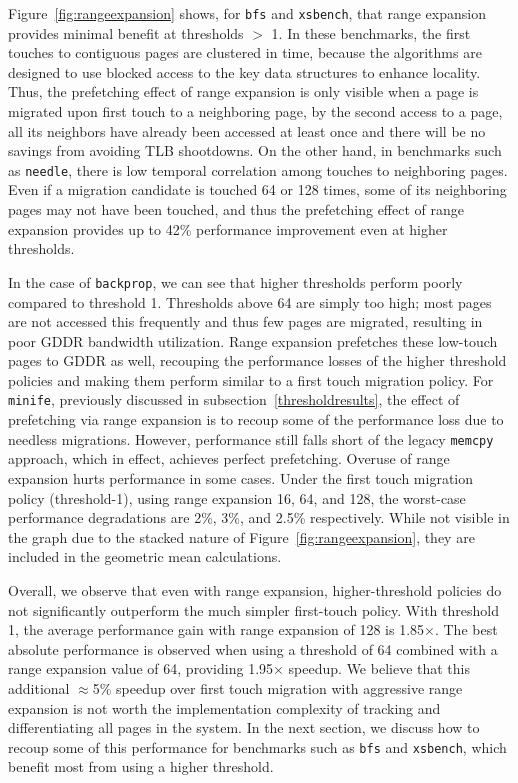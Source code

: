 Figure~\ref{fig:rangeexpansion} shows, for {\tt bfs} and {\tt xsbench}, that range expansion provides minimal
benefit at thresholds $>$ 1. In these benchmarks, the first touches to
contiguous pages are clustered in time, because the algorithms are designed to use blocked access to the key 
data structures to enhance locality. Thus, the prefetching effect of range
expansion is only visible when a page is migrated upon first touch to a
neighboring page, by the second access to a page, all its neighbors have already been accessed 
at least once and there will be no savings from avoiding TLB shootdowns. On the other hand, in benchmarks 
such as {\tt needle}, there is low temporal correlation among touches to neighboring pages.
Even if a migration candidate is touched 64 or 128 times, some of its
neighboring pages may not have been touched, and thus the prefetching
effect of range expansion provides up to 42\% performance improvement even at higher thresholds.

In the case of {\tt backprop}, we can see that higher thresholds perform poorly
compared to threshold 1. Thresholds above 64 are simply too high; most pages are not accessed
this frequently and thus few pages are migrated, resulting in poor GDDR bandwidth utilization.
Range expansion prefetches these low-touch pages to GDDR as well, recouping the performance losses 
of the higher threshold policies and making them perform similar to a first touch migration policy.
For {\tt minife}, previously discussed in subsection~\ref{thresholdresults}, the effect of prefetching
via range expansion is to recoup some of the performance loss due to needless migrations. However,
performance still falls short of the legacy {\tt memcpy} approach, which in effect, achieves perfect prefetching.
Overuse of range expansion hurts performance in some cases. Under the 
first touch migration policy (threshold-1), using range expansion 16, 64, and 128, the worst-case
performance degradations are 2\%, 3\%, and 2.5\% respectively. While not visible in the graph due to the stacked
nature of Figure~\ref{fig:rangeexpansion}, they are included in the geometric mean calculations.

Overall, we observe that even with range expansion, higher-threshold policies
do not significantly outperform the much simpler first-touch policy. 
With threshold 1, the average performance gain with range expansion of 128 is
1.85$\times$.  The best absolute performance is observed when using a threshold of
64 combined with a range expansion value of 64, providing 1.95$\times$ speedup.
We believe that this additional $\approx$5\% speedup over first touch migration with
aggressive range expansion is not worth the implementation complexity of
tracking and differentiating all pages in the system. In the next section, we discuss how
to recoup some of this performance for benchmarks such as {\tt bfs} and {\tt xsbench}, which 
benefit most from using a higher threshold.
